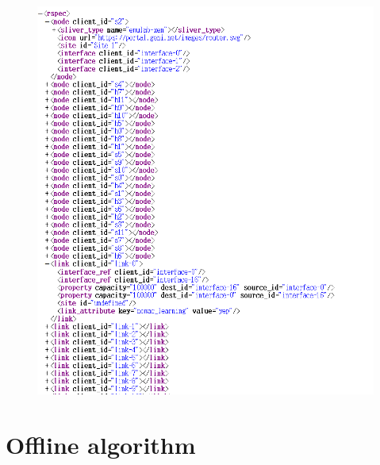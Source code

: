 \documentclass[a4paper,12pt]{report}
\begin{document}
\begin{CJK*}{UTF8}{bkai}
\begin{large}
\begin{figure}
	            \includegraphics[width=1.0\textwidth]{rspec_format.png}
	      	\end{figure}
	   \section{Offline algorithm}

\end{large}
\end{CJK*}
\end{document}
